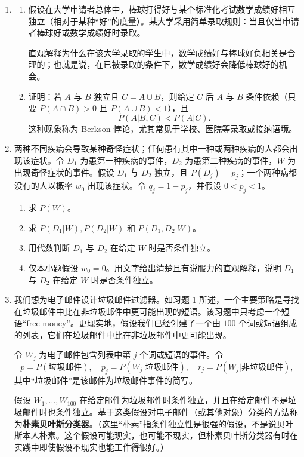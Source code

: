 \documentclass[UTF8,12pt,a4paper,fontset=fandol]{ctexart}
\begin{document}
\begin{enumerate}
  \item
  \begin{enumerate}
    \item 假设在大学申请者总体中，棒球打得好与某个标准化考试数学成绩好相互独立（相对于某种“好”的度量）。某大学采用简单录取规则：当且仅当申请者棒球好或数学成绩好时录取。

    直观解释为什么在该大学录取的学生中，数学成绩好与棒球好负相关是合理的；也就是说，在已被录取的条件下，数学成绩好会降低棒球好的机会。

    \item 证明：若 $A$ 与 $B$ 独立且 $C=A\cup B$，则给定 $C$ 后 $A$ 与 $B$ 条件依赖（只要 $P(A\cap B)>0$ 且 $P(A\cup B)<1$），且
    \[
      P(A|B,C)<P(A|C).
    \]
    这种现象称为 Berkson 悖论，尤其常见于学校、医院等录取或接纳语境。
  \end{enumerate}

  \item 两种不同疾病会导致某种奇怪症状；任何患有其中一种或两种疾病的人都会出现该症状。令 $D_1$ 为患第一种疾病的事件，$D_2$ 为患第二种疾病的事件，$W$ 为出现奇怪症状的事件。假设 $D_1$ 与 $D_2$ 独立，且 $P(D_j)=p_j$；一个两种病都没有的人以概率 $w_0$ 出现该症状。令 $q_j=1-p_j$，并假设 $0<p_j<1$。
  \begin{enumerate}
    \item 求 $P(W)$。
    \item 求 $P(D_1|W),P(D_2|W)$ 和 $P(D_1,D_2|W)$。
    \item 用代数判断 $D_1$ 与 $D_2$ 在给定 $W$ 时是否条件独立。
    \item 仅本小题假设 $w_0=0$。用文字给出清楚且有说服力的直观解释，说明 $D_1$ 与 $D_2$ 在给定 $W$ 时是否条件独立。
  \end{enumerate}

  \item 我们想为电子邮件设计垃圾邮件过滤器。如习题 1 所述，一个主要策略是寻找在垃圾邮件中比在非垃圾邮件中更可能出现的短语。该习题中只考虑一个短语“free money”。更现实地，假设我们已经创建了一个由 $100$ 个词或短语组成的列表，它们在垃圾邮件中比在非垃圾邮件中更可能出现。

  令 $W_j$ 为电子邮件包含列表中第 $j$ 个词或短语的事件。令
  \[
    p=P(\text{垃圾邮件}),\quad
    p_j=P(W_j|\text{垃圾邮件}),\quad
    r_j=P(W_j|\text{非垃圾邮件}),
  \]
  其中“垃圾邮件”是该邮件为垃圾邮件事件的简写。

  假设 $W_1,\ldots,W_{100}$ 在给定邮件为垃圾邮件时条件独立，并且在给定邮件不是垃圾邮件时也条件独立。基于这类假设对电子邮件（或其他对象）分类的方法称为\textbf{朴素贝叶斯分类器}。（这里“朴素”指条件独立性是很强的假设，不是说贝叶斯本人朴素。这个假设可能现实，也可能不现实，但朴素贝叶斯分类器有时在实践中即使假设不现实也能工作得很好。）


\end{enumerate}
\end{document}

